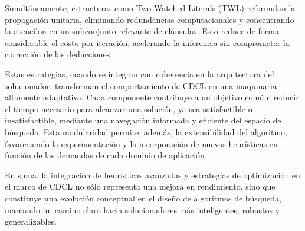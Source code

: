 \begin{conclusions}
Simult\'aneamente, estructuras como Two Watched Literals (TWL) reformulan la propagaci\'on unitaria, eliminando redundancias computacionales y concentrando la atenci'on en un subconjunto relevante de cl\'ausulas. Esto reduce de forma considerable el costo por iteraci\'on, acelerando la inferencia sin comprometer la correcci\'on de las deducciones.

Estas estrategias, cuando se integran con coherencia en la arquitectura del solucionador, transforman el comportamiento de CDCL en una maquinaria altamente adaptativa. Cada componente contribuye a un objetivo com\'un: reducir el tiempo necesario para alcanzar una soluci\'on, ya sea satisfactible o insatisfactible, mediante una navegaci\'on informada y eficiente del espacio de b\'usqueda. Esta modularidad permite, adem\'as, la extensibilidad del algoritmo, favoreciendo la experimentaci\'on y la incorporaci\'on de nuevas heur\'isticas en funci\'on de las demandas de cada dominio de aplicaci\'on.

En suma, la integraci\'on de heur\'isticas avanzadas y estrategias de optimizaci\'on en el marco de CDCL no s\'olo representa una mejora en rendimiento, sino que constituye una evoluci\'on conceptual en el dise\~no de algoritmos de b\'usqueda, marcando un camino claro hacia solucionadores m\'as inteligentes, robustos y generalizables.


\end{conclusions}
